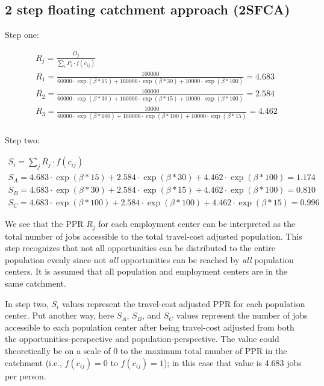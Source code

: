 \documentclass[]{elsarticle} %
\begin{document}
\hypertarget{step-floating-catchment-approach-2sfca}{%
\subsection{2 step floating catchment approach
(2SFCA)}\label{step-floating-catchment-approach-2sfca}}

Step one:

\begin{equation}
\begin{array}{l}
R_{j} = \frac{O_{j}}{\sum_i P_{i} \cdot f(c_{ij})}\\

R_{1} = \frac{100000}{60000 \cdot \exp(\beta*15) + 160000 \cdot \exp(\beta*30) + 10000 \cdot \exp(\beta*100)} = 4.683 \\
R_{2} = \frac{100000}{60000 \cdot \exp(\beta*30) + 160000 \cdot \exp(\beta*15) + 10000 \cdot \exp(\beta*100)} = 2.584 \\
R_{3} = \frac{10000}{60000 \cdot \exp(\beta*100) + 160000 \cdot \exp(\beta*100) + 10000 \cdot \exp(\beta*15)} = 4.462 \\
\end{array}
\end{equation}

Step two:

\begin{equation}
\begin{array}{l}
S_{i} = {\sum_j R_{j} \cdot f(c_{ij})}\\
S_{A} = 4.683 \cdot \exp(\beta*15) + 2.584 \cdot \exp(\beta*30) + 4.462 \cdot \exp(\beta*100) = 1.174 \\
S_{B} = 4.683 \cdot \exp(\beta*30) + 2.584 \cdot \exp(\beta*15) + 4.462 \cdot \exp(\beta*100) = 0.810 \\
S_{C} = 4.683 \cdot \exp(\beta*100) + 2.584 \cdot \exp(\beta*100) + 4.462 \cdot \exp(\beta*15) = 0.996
\end{array}
\end{equation}

We see that the PPR \(R_{j}\) for each employment center can be
interpreted as the total number of jobs accessible to the total
travel-cost adjusted population. This step recognizes that not all
opportunities can be distributed to the entire population evenly since
not \emph{all} opportunities can be reached by \emph{all} population
centers. It is assumed that all population and employment centers are in
the same catchment.

In step two, \(S_{i}\) values represent the travel-cost adjusted PPR for
each population center. Put another way, here \(S_{A}\), \(S_{B}\), and
\(S_{C}\) values represent the number of jobs accessible to each
population center after being travel-cost adjusted from both the
opportunities-perspective and population-perspective. The value could
theoretically be on a scale of 0 to the maximum total number of PPR in
the catchment (i.e., \(f(c_{ij})=0\) to \(f(c_{ij})=1\)); in this case
that value is 4.683 jobs per person.
\end{document}
